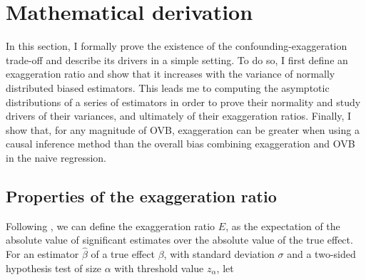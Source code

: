 \documentclass[usletter, 12pt]{article}
\begin{document}


	
	\section{Mathematical derivation} \label{maths}
						
		In this section, I formally prove the existence of the confounding-exaggeration trade-off  and describe its drivers in a simple setting.%
		To do so, I first define an exaggeration ratio  and show that it increases with the variance of normally distributed biased estimators. This leads me to computing the asymptotic distributions of a series of estimators in order to prove their normality and study drivers of their variances, and ultimately of their exaggeration ratios. Finally, I show that, for any magnitude of OVB, exaggeration can be greater when using a causal inference method than the overall bias combining exaggeration and OVB in the naive regression.
		
		
		\subsection{Properties of the exaggeration ratio}\label{general_exagg}
		
			Following  \cite{gelman_beyond_2014}, we can define the exaggeration ratio $E$, as the expectation of the absolute value of significant estimates over the absolute value of the true effect. For an estimator $\hat{\beta}$ of a true effect $\beta$, with standard deviation $\sigma$ and a two-sided hypothesis test of size $\alpha$ with threshold value $z_{\alpha}$, let
			
		 
\end{document}
